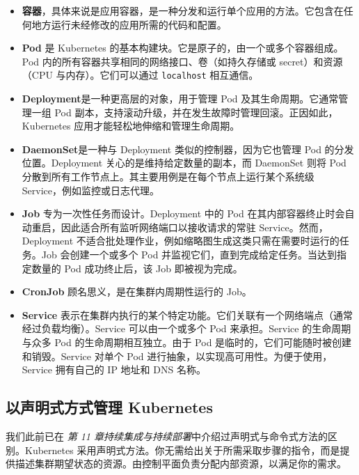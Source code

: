 \begin{itemize}
\label{idx:1957}
\label{idx:1958}
\item \textbf{容器}，具体来说是应用容器，是一种分发和运行单个应用的方法。它包含在任何地方运行未经修改的应用所需的代码和配置。
\label{idx:1959}
\label{idx:1960}
\item \textbf{Pod} 是 Kubernetes 的基本构建块。它是原子的，由一个或多个容器组成。Pod 内的所有容器共享相同的网络接口、卷（如持久存储或 secret）和资源（CPU 与内存）。它们可以通过 \texttt{localhost} 相互通信。
\label{idx:1961}
\label{idx:1962}
\label{idx:1963}
\label{idx:1964}
\item \textbf{Deployment}是一种更高层的对象，用于管理 Pod 及其生命周期。它通常管理一组 Pod 副本，支持滚动升级，并在发生故障时管理回滚。正因如此，Kubernetes 应用才能轻松地伸缩和管理生命周期。
\label{idx:1965}
\label{idx:1966}
\item \textbf{DaemonSet}是一种与 Deployment 类似的控制器，因为它也管理 Pod 的分发位置。Deployment 关心的是维持给定数量的副本，而 DaemonSet 则将 Pod 分散到所有工作节点上。其主要用例是在每个节点上运行某个系统级 Service，例如监控或日志代理。
\label{idx:1967}
\label{idx:1968}
\item \textbf{Job} 专为一次性任务而设计。Deployment 中的 Pod 在其内部容器终止时会自动重启，因此适合所有监听网络端口以接收请求的常驻 Service。然而，Deployment 不适合批处理作业，例如缩略图生成这类只需在需要时运行的任务。Job 会创建一个或多个 Pod 并监视它们，直到完成给定任务。当达到指定数量的 Pod 成功终止后，该 Job 即被视为完成。
\label{idx:1969}
\label{idx:1970}
\item \textbf{CronJob} 顾名思义，是在集群内周期性运行的 Job。
\label{idx:1971}
\label{idx:1972}
\item \textbf{Service} 表示在集群内执行的某个特定功能。它们关联有一个网络端点（通常经过负载均衡）。Service 可以由一个或多个 Pod 来承担。Service 的生命周期与众多 Pod 的生命周期相互独立。由于 Pod 是临时的，它们可能随时被创建和销毁。Service 对单个 Pod 进行抽象，以实现高可用性。为便于使用，Service 拥有自己的 IP 地址和 DNS 名称。
\end{itemize}

\subsection{以声明式方式管理 Kubernetes}

\label{idx:1973}
我们此前已在 \emph{第 11 章}\emph{持续集成与持续部署}中介绍过声明式与命令式方法的区别。Kubernetes 采用声明式方法。你无需给出关于所需采取步骤的指令，而是提供描述集群期望状态的资源。由控制平面负责分配内部资源，以满足你的需求。

